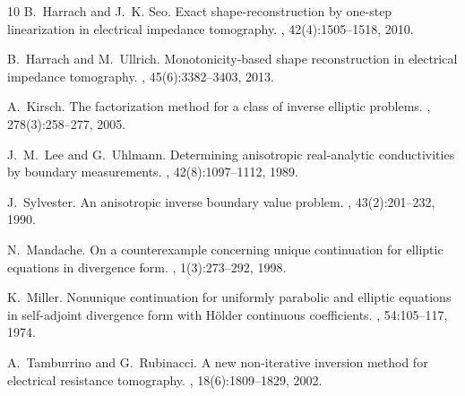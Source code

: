 \documentclass[reqno]{amsart}
\numberwithin{equation}{section}
\numberwithin{figure}{section}
\numberwithin{table}{section}
\theoremstyle{plain}
\theoremstyle{definition}
\theoremstyle{remark}
\begin{document}
\begin{thebibliography}{10}
	B.~Harrach and J.~K. Seo.
	\newblock Exact shape-reconstruction by one-step linearization in electrical impedance tomography.
	, 42(4):1505--1518, 2010.
	
	B.~Harrach and M.~Ullrich.
	\newblock Monotonicity-based shape reconstruction in electrical impedance tomography.
	, 45(6):3382--3403, 2013.
	
	A.~Kirsch.
	\newblock The factorization method for a class of inverse elliptic problems.
	, 278(3):258--277, 2005.
	
	J.~M.~Lee and G.~Uhlmann.
	\newblock Determining anisotropic real-analytic conductivities by boundary measurements.
	, 42(8):1097--1112, 1989.
	
	J.~Sylvester.
	\newblock An anisotropic inverse boundary value problem.
	, 43(2):201--232, 1990.
	
	N.~Mandache. 
	\newblock On a counterexample concerning unique continuation for elliptic equations in divergence form. 
	, 1(3):273--292, 1998.
	
	K.~Miller.
	\newblock Nonunique continuation for uniformly parabolic and elliptic equations in self-adjoint divergence form with H\"older continuous coefficients.
	, 54:105--117, 1974.
	
	A.~Tamburrino and G.~Rubinacci.
	\newblock A new non-iterative inversion method for electrical resistance tomography.
	, 18(6):1809--1829, 2002.
		
	\end{thebibliography}
	
\end{document}
